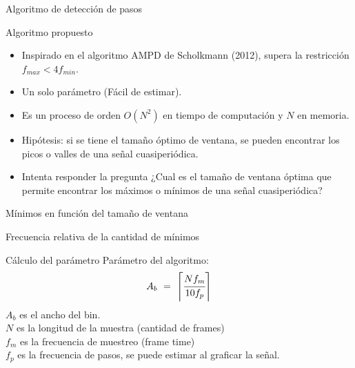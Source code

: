 \documentclass[aspectratio=169,spanish]{beamer} %
\newcommand{\fullbackground}[1]{\usebackgroundtemplate{\texttt{[image: \#1]}}}
\begin{document}
\fullbackground{images/ending.png}

\begin{frame}
\end{frame}

\fullbackground{images/slide.png}

\begin{frame}{Algoritmo de detección de pasos}
    
\end{frame}

\begin{frame}{Algoritmo propuesto}
    \begin{itemize}
        \item Inspirado en el algoritmo AMPD de Scholkmann (2012), supera la restricción $f_{max} < 4 f_{min}$.
        \item Un solo parámetro (Fácil de estimar).
        \item Es un proceso de orden $O(N^2)$ en tiempo de computación y $N$ en memoria. 
        \item Hipótesis: si se tiene el tamaño óptimo de ventana, se pueden encontrar los picos o valles de una señal cuasiperiódica.
        \item Intenta responder la pregunta ¿Cual es el tamaño de ventana óptima que permite encontrar los máximos o mínimos de una señal cuasiperiódica?
    \end{itemize}
\end{frame}

\begin{frame}{Mínimos en función del tamaño de ventana}
    
\end{frame}

\begin{frame}{Frecuencia relativa de la cantidad de mínimos}
    
\end{frame}

\begin{frame}{Cálculo del parámetro}
    Parámetro del algoritmo:
    \begin{equation}\label{ancho_b}
         A_b\ =\ \left\lceil \cfrac{N f_m}{10 f_p} \right\rceil
    \end{equation}
$A_b$ es el ancho del bin. \\    
$N$ es la longitud de la muestra (cantidad de frames) \\
$f_m$ es la frecuencia de muestreo (frame time) \\
$f_p$ es la frecuencia de pasos, se puede estimar al graficar la señal. 
\end{frame}
\end{document}
